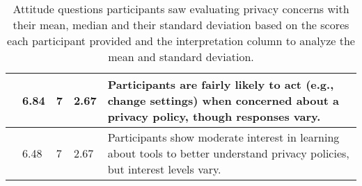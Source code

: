 \begin{table}[htb]
\begin{tabular}{@{}p{}|l|l|l|p{}@{}}
    \qThirteen{}
     & 6.84	& 7	& 2.67 &
     Participants are fairly likely to act (e.g., change settings) when concerned about a privacy policy, though responses vary.
\\\hline

     \qFourteen{}
     & 6.48	& 7	& 2.67 &
     Participants show moderate interest in learning about tools to better understand privacy policies, but interest levels vary.

     \\\hline
    \end{tabular}
    \caption{Attitude questions participants saw evaluating privacy concerns with their mean, median and their standard deviation based on the scores each participant provided and the interpretation column to analyze the mean and standard deviation.}
    \label{table: demoStats}
\end{table}